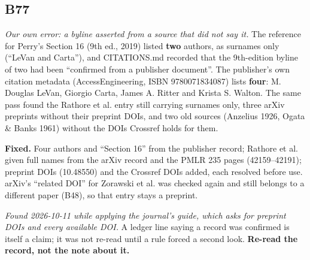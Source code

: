 \documentclass[10pt]{article}
\begin{document}
\subsection*{B77}\label{led:B77}
\begin{description}[leftmargin=0pt,itemsep=1pt]
\item[Defect.] \emph{Our own error: a byline asserted from a source that did not say it.} The reference for Perry's Section 16 (9th ed., 2019) listed \textbf{two} authors, as surnames only (``LeVan and Carta''), and CITATIONS.md recorded that the 9th-edition byline of two had been ``confirmed from a publisher document''. The publisher's own citation metadata (AccessEngineering, ISBN 9780071834087) lists \textbf{four}: M. Douglas LeVan, Giorgio Carta, James A. Ritter and Krista S. Walton. The same pass found the Rathore et al. entry still carrying surnames only, three arXiv preprints without their preprint DOIs, and two old sources (Anzelius 1926, Ogata \& Banks 1961) without the DOIs Crossref holds for them.
\item[Resolution.] \textbf{Fixed.} Four authors and ``Section 16'' from the publisher record; Rathore et al. given full names from the arXiv record and the PMLR 235 pages (42159--42191); preprint DOIs (10.48550) and the Crossref DOIs added, each resolved before use. arXiv's ``related DOI'' for Zorawski et al. was checked again and still belongs to a different paper (B48), so that entry stays a preprint.
\item[Note.] \emph{Found 2026-10-11 while applying the journal's guide, which asks for preprint DOIs and every available DOI.} A ledger line saying a record was confirmed is itself a claim; it was not re-read until a rule forced a second look. \textbf{Re-read the record, not the note about it.}
\end{description}
\end{document}
